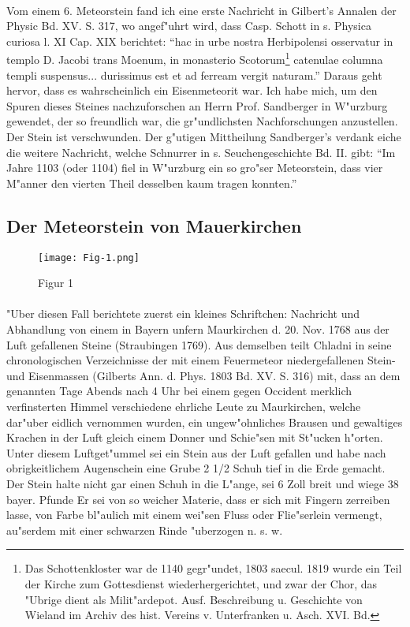 \documentclass[a4paper, 11pt, oneside]{article}
\begin{document}
\paragraph{}
Vom einem 6. Meteorstein fand ich eine erste Nachricht in Gilbert's Annalen der Physic Bd. XV. S. 317, wo angef"uhrt wird, dass Casp. Schott in s. Physica curiosa l. XI Cap. XIX berichtet: "`hac in urbe nostra Herbipolensi osservatur in templo D. Jacobi trans Moenum, in monasterio Scotorum\footnote{Das Schottenkloster war de 1140 gegr"undet, 1803 saecul. 1819 wurde ein Teil der Kirche zum Gottesdienst wiederhergerichtet, und zwar der Chor, das "Ubrige dient als Milit"ardepot. Ausf. Beschreibung u. Geschichte von Wieland im Archiv des hist. Vereins v. Unterfranken u. Asch. XVI. Bd.} catenulae columna templi suspensus... durissimus est et ad ferream vergit naturam."' Daraus geht hervor, dass es wahrscheinlich ein Eisenmeteorit war. Ich habe mich, um den Spuren dieses Steines nachzuforschen an Herrn Prof. Sandberger in W"urzburg gewendet, der so freundlich war, die gr"undlichsten Nachforschungen anzustellen. Der Stein ist verschwunden. Der g"utigen Mittheilung Sandberger's verdank eiche die weitere Nachricht, welche Schnurrer in s. Seuchengeschichte Bd. II. gibt: "`Im Jahre 1103 (oder 1104) fiel in W"urzburg ein so gro"ser Meteorstein, dass vier M"anner den vierten Theil desselben kaum tragen konnten."'
\clearpage
\subsection{Der Meteorstein von Mauerkirchen}
\begin{figure}[h]
\centering
\texttt{[image: Fig-1.png]}
\caption{Figur 1}
\end{figure}
\paragraph{}
"Uber diesen Fall berichtete zuerst ein kleines Schriftchen: Nachricht und Abhandlung von einem in Bayern unfern Maurkirchen d. 20. Nov. 1768 aus der Luft gefallenen Steine (Straubingen 1769). Aus demselben teilt Chladni in seine chronologischen Verzeichnisse der mit einem Feuermeteor niedergefallenen Stein- und Eisenmassen (Gilberts Ann. d. Phys. 1803 Bd. XV. S. 316) mit, dass an dem genannten Tage Abends nach 4 Uhr bei einem gegen Occident merklich verfinsterten Himmel verschiedene ehrliche Leute zu Maurkirchen, welche dar"uber eidlich vernommen wurden, ein ungew"ohnliches Brausen und gewaltiges Krachen in der Luft gleich einem Donner und Schie"sen mit St"ucken h"orten. Unter diesem Luftget"ummel sei ein Stein aus der Luft gefallen und habe nach obrigkeitlichem Augenschein eine Grube 2 1/2 Schuh tief in die Erde gemacht. Der Stein halte nicht gar einen Schuh in die L"ange, sei 6 Zoll breit und wiege 38 bayer. Pfunde Er sei von so weicher Materie, dass er sich mit Fingern zerreiben lasse, von Farbe bl"aulich mit einem wei"sen Fluss oder Flie"serlein vermengt, au"serdem mit einer schwarzen Rinde "uberzogen n. s. w.
\end{document}
